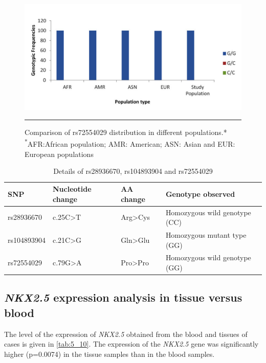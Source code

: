 \begin{refsection}
\begin{figure}[!htb]
\centering
\includegraphics[width=\linewidth]{Figures/Figure5_12.pdf}
\rule{35em}{0.5pt}
\caption[Comparison of rs72554029 distribution in different populations]{Comparison of rs72554029 distribution in different populations.*\\{\textsuperscript{*}\footnotesize{AFR:African population; AMR: American; ASN: Asian and EUR: European populations}}}
\label{fig:5_12}
\end{figure}

\begin{table}[!tb]
\centering
\caption[Details of rs28936670, rs104893904 and rs72554029]{Details of rs28936670, rs104893904 and rs72554029}
\label{tab:5_9}
\begin{tabular}{ P{0.9in} P{0.75in} P{0.75in} P{2.3in} }
\toprule
	\textbf{SNP} & \textbf{Nucleotide change} & \textbf{AA change} & \textbf{Genotype observed} \\ \toprule
	rs28936670 & c.25C>T & Arg>Cys & Homozygous wild genotype (CC) \\ \midrule
	rs104893904 & c.21C>G & Gln>Glu & Homozygous mutant type (GG) \\ \midrule
	rs72554029 & c.79G>A & Pro>Pro & Homozygous wild genotype (GG) \\ \bottomrule
\end{tabular}
\end{table}

\subsection{\textit{NKX2.5} expression analysis in tissue versus blood}

The level of the expression of \textit{NKX2.5} obtained from the blood and tissues of cases is given in \cref{tab:5_10}. The expression of the \textit{NKX2.5} gene was significantly higher (p=0.0074) in the tissue samples than in the blood samples. 


\end{refsection}
